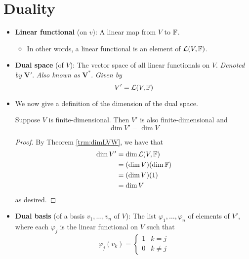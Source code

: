 \documentclass[../main.tex]{subfiles}
\begin{document}
\section{Duality}
\begin{itemize}
    \item {}\textbf{Linear functional} (on $v$): A linear map from $V$ to $\mathbb{F}$.
    \begin{itemize}
        \item In other words, a linear functional is an element of $\mathcal{L}(V,\mathbb{F})$.
    \end{itemize}
    \item \textbf{Dual space} (of $V$): The vector space of all linear functionals on $V$. \emph{Denoted by} $\bm{V'}$. \emph{Also known as} $\bm{V^*}$. \emph{Given by}
    \begin{equation*}
        V' = \mathcal{L}(V,\mathbb{F})
    \end{equation*}
    \item We now give a definition of the dimension of the dual space.
    \begin{theorem}\label{trm:dimDualSpace}
        Suppose $V$ is finite-dimensional. Then $V'$ is also finite-dimensional and
        \begin{equation*}
            \dim V' = \dim V
        \end{equation*}
        \begin{proof}
            By Theorem \ref{trm:dimLVW}, we have that
            \begin{align*}
                \dim V' &= \dim\mathcal{L}(V,\mathbb{F})\\
                &= (\dim V)(\dim\mathbb{F})\\
                &= (\dim V)(1)\\
                &= \dim V
            \end{align*}
            as desired.
        \end{proof}
    \end{theorem}
    \item \textbf{Dual basis} (of a basis $v_1,\dots,v_n$ of $V$): The list $\varphi_1,\dots,\varphi_n$ of elements of $V'$, where each $\varphi_j$ is the linear functional on $V$ such that
    \begin{equation*}
        \varphi_j(v_k) =
        \begin{cases}
            1 & k=j\\
            0 & k\neq j
        \end{cases}
    \end{equation*}

\end{itemize}
\end{document}

